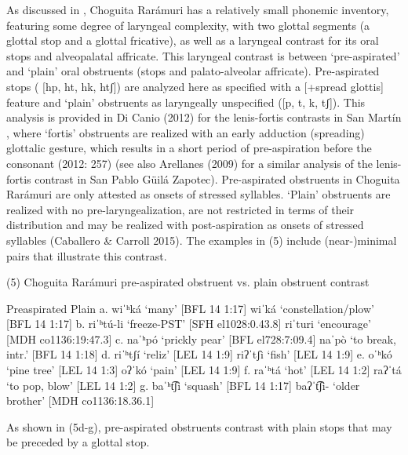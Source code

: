 As discussed in , Choguita Rarámuri has a relatively small phonemic inventory, featuring some degree of laryngeal complexity, with two glottal segments (a glottal stop and a glottal fricative), as well as a laryngeal contrast for its oral stops and alveopalatal affricate. This laryngeal contrast is between ‘pre-aspirated’ and ‘plain’ oral obstruents (stops and palato-alveolar affricate). Pre-aspirated stops ( [hp, ht, hk, htʃ]) are analyzed here as specified with a [+spread glottis] feature and ‘plain’ obstruents as laryngeally unspecified ([p, t, k, tʃ]). This analysis is provided in Di Canio (2012) for the lenis-fortis contrasts in San Martín , where ‘fortis’ obstruents are realized with an early adduction (spreading) glottalic gesture, which results in a short period of pre-aspiration before the consonant (2012: 257) (see also Arellanes (2009) for a similar analysis of the lenis-fortis contrast in San Pablo Güilá Zapotec). Pre-aspirated obstruents in Choguita Rarámuri are only attested as onsets of stressed syllables. ‘Plain’ obstruents are realized with no pre-laryngealization, are not restricted in terms of their distribution and may be realized with post-aspiration as onsets of stressed syllables (Caballero \& Carroll 2015). The examples in (5) include (near-)minimal pairs that illustrate this contrast.

(5)	Choguita Rarámuri pre-aspirated obstruent vs. plain obstruent contrast

	Preaspirated					Plain
a.	wiˈʰká   	‘many’ 		[BFL 14 1:17]		wiˈká 	‘constellation/plow’ [BFL 14 1:17]
b.	riˈʰtú-li  	‘freeze-PST’	[SFH el1028:0.43.8]	riˈturi 	‘encourage’ 	       [MDH co1136:19:47.3]
c.	naˈʰpó 	‘prickly pear’	[BFL el728:7:09.4]		naˈpò	‘to break, intr.’	       [BFL 14 1:18]
d.	riˈʰtʃí	‘reliz’		[LEL 14 1:9]		riʔˈtʃì	‘fish’		       [LEL 14 1:9]
e.	oˈʰkó	‘pine tree’	[LEL 14 1:3]		oʔˈkó 	‘pain’		        [LEL 14 1:9]
f.	raˈʰtá	‘hot’		[LEL 14 1:2]		raʔˈtá	‘to pop, blow’          [LEL 14 1:2]
g.	baˈʰt͡ʃi	‘squash’	[BFL 14 1:17]		baʔˈt͡ʃi-	‘older brother’	       [MDH co1136:18.36.1]

As shown in (5d-g), pre-aspirated obstruents contrast with plain stops that may be preceded by a glottal stop.

